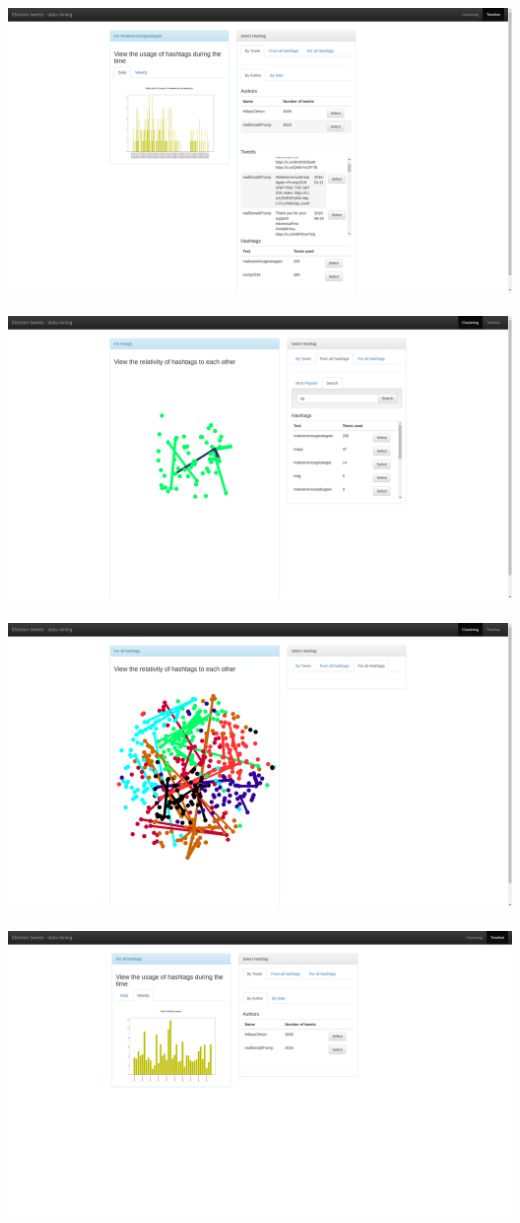 \includegraphics[width=\textwidth]{../Screenshots/a.png} \\ \\
\includegraphics[width=\textwidth]{../Screenshots/b.png} \\ \\
\includegraphics[width=\textwidth]{../Screenshots/c.png} \\ \\
\includegraphics[width=\textwidth]{../Screenshots/d.png}


